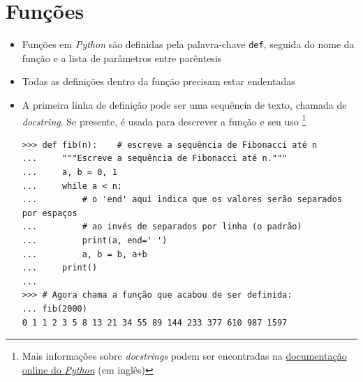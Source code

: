 \section{Funções}
\begin{itemize}
	\item Funções em \textit{Python} são definidas pela palavra-chave \verb|def|, seguida do nome da função e a lista de parâmetros entre parêntesis
	\item Todas as definições dentro da função precisam estar endentadas
	\item A primeira linha de definição pode ser uma sequência de texto, chamada de \textit{docstring}. Se presente, é usada para descrever a função e seu uso \footnote{Mais informações sobre \textit{docstrings} podem ser encontradas na \href{https://docs.python.org/3/tutorial/controlflow.html\#documentation-strings}{documentação online do \textit{Python}} (em inglês)}
	\begin{verbatim}
>>> def fib(n):    # escreve a sequência de Fibonacci até n
...     """Escreve a sequência de Fibonacci até n."""
...     a, b = 0, 1
...     while a < n:
...         # o 'end' aqui indica que os valores serão separados por espaços
...         # ao invés de separados por linha (o padrão)
...         print(a, end=' ')
...         a, b = b, a+b
...     print()
...
>>> # Agora chama a função que acabou de ser definida:
... fib(2000)
0 1 1 2 3 5 8 13 21 34 55 89 144 233 377 610 987 1597
	\end{verbatim}
\end{itemize}

